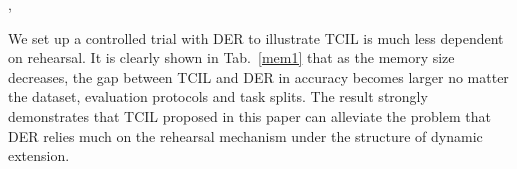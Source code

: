 \documentclass[letterpaper]{article} \usepackage{aaai23}  \usepackage{times}  \usepackage{helvet}  \usepackage{courier}  \usepackage[hyphens]{url}  \usepackage{graphicx} \urlstyle{rm} \def\UrlFont{\rm}  \usepackage{natbib}  \usepackage{caption} \frenchspacing  \setlength{\pdfpagewidth}{8.5in}  \setlength{\pdfpageheight}{11in}  \usepackage{algorithm}
\begin{document}
 \begin{table}
    \centering
\caption{Error statistics on CIFAR100-B0. ITC, ONC, WTC denote inter-task confusion, old-new confusion, within-task confusion, respectively.},
\label{ERROR Analysis}
\end{table}


We set up a controlled trial with DER to illustrate TCIL is much less dependent on rehearsal. It is clearly shown in Tab.~\ref{mem1} that as the memory size decreases, the gap between TCIL and DER in accuracy becomes larger no matter the dataset, evaluation protocols and task splits. The result strongly demonstrates that TCIL proposed in this paper can alleviate the problem that DER relies much on the rehearsal mechanism under the structure of dynamic extension.
\end{document}
